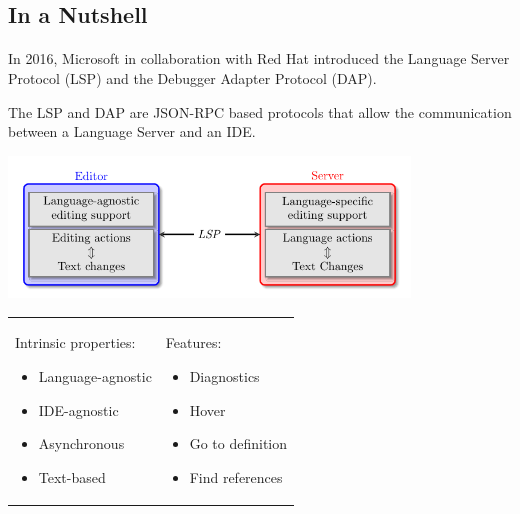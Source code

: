 \documentclass[9pt,xcolor=table,svgnames]{beamer}
\begin{document}
\subsection[In a Nutshell]{In a Nutshell}
\begin{frame}{\secname}
    \framesubtitle{\subsecname}

    In 2016, \alert{Microsoft} in collaboration with \alert{Red Hat} introduced the \alert{Language Server Protocol} (LSP) and the \alert{Debugger Adapter Protocol} (DAP).

    \pause

    \bigskip
    The \alert{LSP} and \alert{DAP} are \alert{JSON-RPC} based protocols that allow the communication between a \alert{Language Server} and an \alert{IDE}.

    \pause

    \begin{center}
    \includegraphics[width=0.8\textwidth]{figs/lsp-diagram.pdf}
    \end{center}

    \begin{tabular}{p{} p{}}
    Intrinsic properties:
    \begin{itemize}
        \item Language-agnostic
        \item IDE-agnostic
        \item Asynchronous
        \item Text-based
    \end{itemize}
        &
    Features:
    \begin{itemize}
        \item Diagnostics
        \item Hover
        \item Go to definition
        \item Find references
    \end{itemize}
    \end{tabular}
\end{frame}
\end{document}
